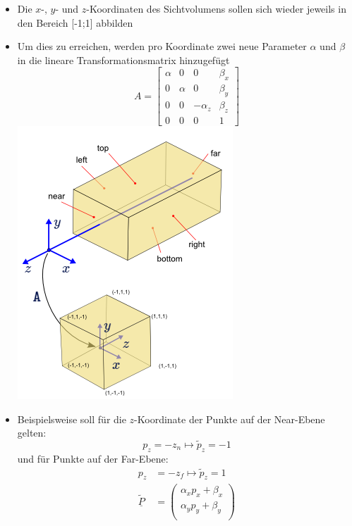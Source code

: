 \documentclass{scrartcl}
\begin{document}
\begin{itemize}
	\item Die $x$-, $y$- und $z$-Koordinaten des Sichtvolumens sollen sich wieder jeweils in den Bereich [-1;1] abbilden
	\item Um dies zu erreichen, werden pro Koordinate zwei neue Parameter $\alpha$ und $\beta$ in die lineare Transformationsmatrix hinzugefügt \\
	\begin{equation}
		A = \begin{bmatrix}
		\alpha & 0 & 0 & \beta_x \\
		0 & \alpha & 0 & \beta_y \\
		0 & 0 & -\alpha_z & \beta_z \\
		0 & 0 & 0 & 1
		\end{bmatrix}
	\end{equation}
	\includegraphics[scale=0.5]{figures/glortho.png}
	\item Beispielsweise soll für die $z$-Koordinate der Punkte auf der Near-Ebene gelten:
	\begin{equation}
			p_z = -z_n \mapsto \widetilde{p}_z = -1
	\end{equation}
	und für Punkte auf der Far-Ebene:
	\begin{equation}
		\begin{split}
			p_z &= -z_f \mapsto \widetilde{p}_z = 1 \\
			\underline{\widetilde{P}} &= \begin{pmatrix}
			\alpha_x p_x + \beta_x \\
			\alpha_y p_y + \beta_y \\

\end{pmatrix}
\end{split}
\end{equation}
\end{itemize}
\end{document}
